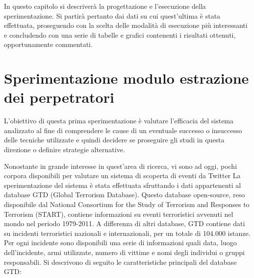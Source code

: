



In questo capitolo si descriverà la progettazione e l'esecuzione della sperimentazione. Si partirà pertanto dai dati su cui quest'ultima è stata effettuata, proseguendo con la scelta delle modalità di esecuzione più interessanti e concludendo con una serie di tabelle e grafici contenenti i risultati ottenuti, opportunamente commentati.  
\section{Sperimentazione modulo estrazione dei perpetratori}
L'obiettivo di questa prima sperimentazione è valutare l'efficacia del sistema analizzato al fine di comprendere le cause di un eventuale successo o insuccesso delle tecniche utilizzate e quindi decidere se proseguire gli studi in questa direzione o definire strategie alternative.


Nonostante in grande interesse in quest'area di ricerca, vi sono ad oggi, pochi corpora disponibili per valutare un sistema di scoperta di eventi da Twitter
La sperimentazione del sistema è stata effettuata sfruttando i dati appartenenti al database GTD (Global Terrorism Database)\cite{GTD}.
Questo database open-source, reso disponibile dal National Consortium for the Study of Terrorism and Responses to Terrorism (START), contiene informazioni su eventi terroristici avvenuti nel mondo nel periodo 1979-2011. A differenza di altri database, GTD contiene dati su incidenti terroristici nazionali e internazionali, per un totale di 104.000 istanze. Per ogni incidente sono disponibili una serie di informazioni quali data, luogo dell'incidente, armi utilizzate, numero di vittime e nomi degli individui o gruppi responsabili.
Si descrivono di seguito le caratteristiche principali del database GTD:
 



